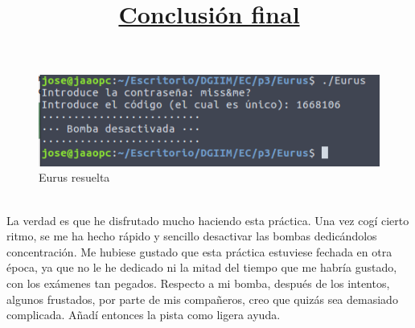 \documentclass[11pt,a4paper]{article}
\begin{document}
\begin{figure}[H] 
	\centering
	\includegraphics[scale=0.45]{capturas/Eurus3.png} 
	\caption{Eurus resuelta} \label{fig:figura25}
\end{figure}

\title{\large{\textbf{\underline{Conclusión final}}}} \\

La verdad es que he disfrutado mucho haciendo esta práctica. Una vez cogí cierto ritmo, se me ha hecho rápido y sencillo desactivar las bombas dedicándolos concentración. Me hubiese gustado que esta práctica estuviese fechada en otra época, ya que no le he dedicado ni la mitad del tiempo que me habría gustado, con los exámenes tan pegados. Respecto a mi bomba, después de los intentos, algunos frustados, por parte de mis compañeros, creo que quizás sea demasiado complicada. Añadí entonces la pista como ligera ayuda. \\
\end{document}
